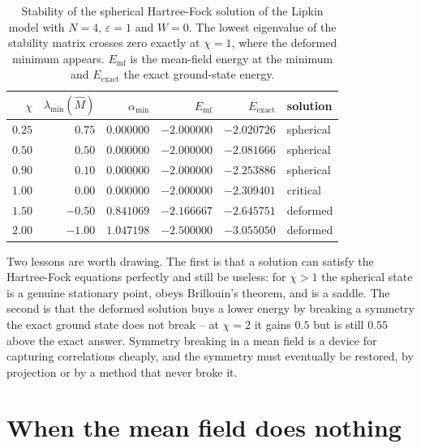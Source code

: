 \begin{table}[h]
\centering
\renewcommand{\arraystretch}{1.25}
\setlength{\tabcolsep}{9pt}
\begin{tabular}{rrrrrl}
\toprule
$\chi$ & $\lambda_{\min}(\hat{M})$ & $\alpha_{\min}$
  & $E_{\mathrm{mf}}$ & $E_{\mathrm{exact}}$ & solution\\
\midrule
$0.25$ & $\phantom{-}0.75$ & $0.000000$ & $-2.000000$ & $-2.020726$ & spherical\\
$0.50$ & $\phantom{-}0.50$ & $0.000000$ & $-2.000000$ & $-2.081666$ & spherical\\
$0.90$ & $\phantom{-}0.10$ & $0.000000$ & $-2.000000$ & $-2.253886$ & spherical\\
$1.00$ & $\phantom{-}0.00$ & $0.000000$ & $-2.000000$ & $-2.309401$ & critical\\
$1.50$ & $-0.50$ & $0.841069$ & $-2.166667$ & $-2.645751$ & deformed\\
$2.00$ & $-1.00$ & $1.047198$ & $-2.500000$ & $-3.055050$ & deformed\\
\bottomrule
\end{tabular}
\caption{Stability of the spherical Hartree-Fock solution of the Lipkin model
with $N=4$, $\varepsilon=1$ and $W=0$.  The lowest eigenvalue of the
stability matrix crosses zero exactly at $\chi=1$, where the deformed
minimum appears.  $E_{\mathrm{mf}}$ is the mean-field energy at the minimum
and $E_{\mathrm{exact}}$ the exact ground-state energy.}
\label{tab:lipkinstability}
\end{table}

Two lessons are worth drawing.  The first is that a solution can satisfy the
Hartree-Fock equations perfectly and still be useless: for $\chi>1$ the
spherical state is a genuine stationary point, obeys Brillouin's theorem, and
is a saddle.  The second is that the deformed solution buys a lower energy by
breaking a symmetry the exact ground state does not break -- at $\chi=2$ it
gains $0.5$ but is still $0.55$ above the exact answer.  Symmetry breaking in
a mean field is a device for capturing correlations cheaply, and the symmetry
must eventually be restored, by projection or by a method that never broke it.

\section{When the mean field does nothing}
\label{sec:hfnothing}

